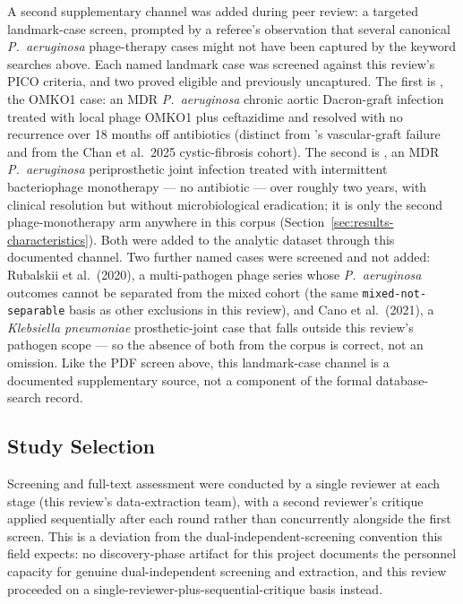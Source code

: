 A second supplementary channel was added during peer review: a targeted landmark-case screen, prompted by a referee's observation that several canonical \textit{P.\ aeruginosa} phage-therapy cases might not have been captured by the keyword searches above. Each named landmark case was screened against this review's PICO criteria, and two proved eligible and previously uncaptured. The first is \textcite{Chan2018_omko1_emph}, the OMKO1 case: an MDR \textit{P.\ aeruginosa} chronic aortic Dacron-graft infection treated with local phage OMKO1 plus ceftazidime and resolved with no recurrence over 18 months off antibiotics (distinct from \textcite{Blasco2023_frontmed}'s vascular-graft failure and from the Chan et al.\ 2025 cystic-fibrosis cohort). The second is \textcite{Arya2026_pji_natcomms}, an MDR \textit{P.\ aeruginosa} periprosthetic joint infection treated with intermittent bacteriophage monotherapy --- no antibiotic --- over roughly two years, with clinical resolution but without microbiological eradication; it is only the second phage-monotherapy arm anywhere in this corpus (Section~\ref{sec:results-characteristics}). Both were added to the analytic dataset through this documented channel. Two further named cases were screened and not added: Rubalskii et al.\ (2020), a multi-pathogen phage series whose \textit{P.\ aeruginosa} outcomes cannot be separated from the mixed cohort (the same \texttt{mixed-not-separable} basis as other exclusions in this review), and Cano et al.\ (2021), a \textit{Klebsiella pneumoniae} prosthetic-joint case that falls outside this review's pathogen scope --- so the absence of both from the corpus is correct, not an omission. Like the PDF screen above, this landmark-case channel is a documented supplementary source, not a component of the formal database-search record.

\subsection{Study Selection}
\label{sec:methods-selection}

Screening and full-text assessment were conducted by a single reviewer at each stage (this review's data-extraction team), with a second reviewer's critique applied sequentially after each round rather than concurrently alongside the first screen. This is a deviation from the dual-independent-screening convention this field expects: no discovery-phase artifact for this project documents the personnel capacity for genuine dual-independent screening and extraction, and this review proceeded on a single-reviewer-plus-sequential-critique basis instead.

